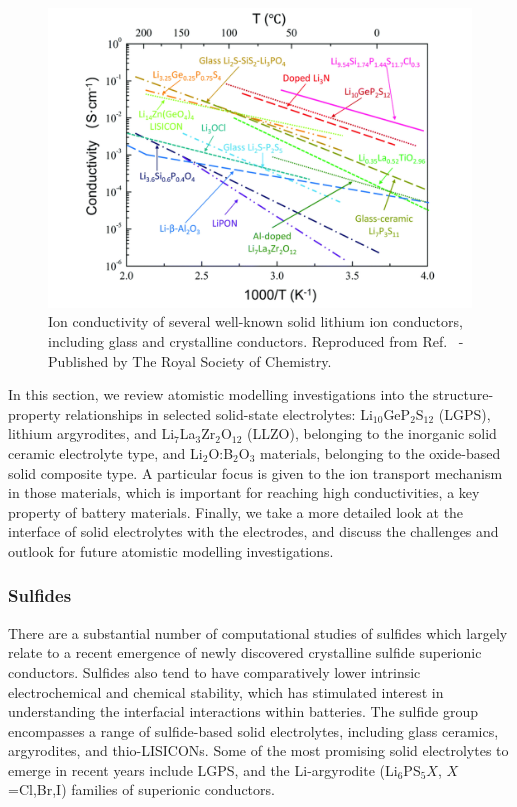 \documentclass[../main.tex]{subfiles}
\begin{document}
\begin{figure}[htbp]
    \centering
    \includegraphics[scale=0.55]{figures/solid_electrolytes.pdf}
    \caption{Ion conductivity of several well-known solid lithium ion conductors, including glass and crystalline conductors. Reproduced from Ref.~ - Published by The Royal Society of Chemistry.}
    \label{fig:conductivity}
\end{figure}

In this section, we review atomistic modelling investigations into the structure-property relationships in selected solid-state electrolytes: Li$_{10}$GeP$_2$S$_{12}$ (LGPS), lithium argyrodites, and Li$_7$La$_3$Zr$_2$O$_{12}$ (LLZO), belonging to the inorganic solid ceramic electrolyte type, and Li$_{2}$O:B$_{2}$O$_{3}$ materials, belonging to the oxide-based solid composite type. A particular focus is given to the ion transport mechanism in those materials, which is important for reaching high conductivities, a key property of battery materials. Finally, we take a more detailed look at the interface of solid electrolytes with the electrodes, and discuss the challenges and outlook for future atomistic modelling investigations.

\subsubsection{Sulfides}
There are a substantial number of computational studies of sulfides which largely relate to a recent emergence of newly discovered crystalline sulfide superionic conductors. Sulfides also tend to have comparatively lower intrinsic electrochemical and chemical stability, which has stimulated interest in understanding the interfacial interactions within batteries.\cite{Xiao2020interfacerev} The sulfide group encompasses a range of sulfide-based solid electrolytes, including glass ceramics,\cite{minami2006recent} argyrodites,\cite{bai2020research} and thio-LISICONs.\cite{minafra2020two} Some of the most promising solid electrolytes to emerge in recent years include LGPS,\cite{Bhandari2016,Kamaya2011,Mo2012} and the Li-argyrodite (Li$_6$PS$_{5}X$, $X$=Cl,Br,I) \cite{kraft2018,deiseroth_li6ps5x_2008,deklerk2016,kraft2017,minafra2018,adeli2019} families of superionic conductors.
\end{document}
